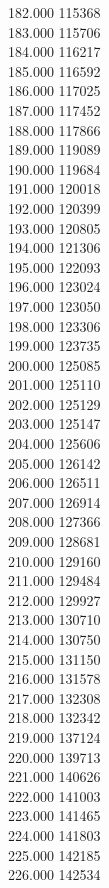 { 182.000	115368 \\
 183.000	115706 \\
 184.000	116217 \\
 185.000	116592 \\
 186.000	117025 \\
 187.000	117452 \\
 188.000	117866 \\
 189.000	119089 \\
 190.000	119684 \\
 191.000	120018 \\
 192.000	120399 \\
 193.000	120805 \\
 194.000	121306 \\
 195.000	122093 \\
 196.000	123024 \\
 197.000	123050 \\
 198.000	123306 \\
 199.000	123735 \\
 200.000	125085 \\
 201.000	125110 \\
 202.000	125129 \\
 203.000	125147 \\
 204.000	125606 \\
 205.000	126142 \\
 206.000	126511 \\
 207.000	126914 \\
 208.000	127366 \\
 209.000	128681 \\
 210.000	129160 \\
 211.000	129484 \\
 212.000	129927 \\
 213.000	130710 \\
 214.000	130750 \\
 215.000	131150 \\
 216.000	131578 \\
 217.000	132308 \\
 218.000	132342 \\
 219.000	137124 \\
 220.000	139713 \\
 221.000	140626 \\
 222.000	141003 \\
 223.000	141465 \\
 224.000	141803 \\
 225.000	142185 \\
 226.000	142534 \\
}

